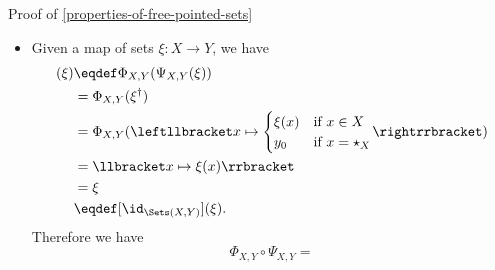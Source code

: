 \begin{Proof}{Proof of \cref{properties-of-free-pointed-sets}}
\begin{itemize}
\begin{align*}
                                                 &=      \Psi_{X,Y}(\xi^{\dagger})\\%
                                                 &\eqdef \leftllbracket x\mapsto{\begin{cases}\xi^{\dagger}(x)&\text{if $x\in X$}\\y_{0}&\text{if $x=\star_{X}$}\end{cases}}\rightrrbracket\\%
                                                 &=      \leftllbracket x\mapsto{\begin{cases}\xi(x)&\text{if $x\in X$}\\y_{0}&\text{if $x=\star_{X}$}\end{cases}}\rightrrbracket\\%
                                                 &=      \xi\\%
                                                 &\eqdef [\id_{\Sets_{*}(X^{+},Y)}](\xi).%
            \end{align*}
            Therefore we have
            \[
                \Psi_{X,Y}\circ\Phi_{X,Y}%
                =%
                \id_{\Sets_{*}(X^{+},Y)}.%
            \]%
        \item\label{proof-of-properties-of-free-pointed-sets-adjointness-4}Given a map of sets $\xi\colon X\to Y$, we have
            \begin{align*}
                [\Phi_{X,Y}\circ\Psi_{X,Y}](\xi) &\eqdef \Phi_{X,Y}(\Psi_{X,Y}(\xi))\\%
                                                 &=      \Phi_{X,Y}(\xi^{\dagger})\\%
                                                 &=      \Phi_{X,Y}(\leftllbracket x\mapsto{\begin{cases}\xi(x)&\text{if $x\in X$}\\y_{0}&\text{if $x=\star_{X}$}\end{cases}}\rightrrbracket)\\%
                                                 &=      \llbracket x\mapsto\xi(x)\rrbracket\\%
                                                 &=      \xi\\%
                                                 &\eqdef [\id_{\Sets(X,Y)}](\xi).%
            \end{align*}
            Therefore we have
            \[
                \Phi_{X,Y}\circ\Psi_{X,Y}%
                =%
\]
\end{itemize}
\end{Proof}
